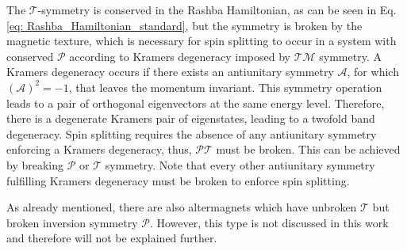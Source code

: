 The $\mathcal{T}$-symmetry is conserved in the Rashba Hamiltonian, as can be seen in Eq. \eqref{eq: Rashba_Hamiltonian_standard}, but the symmetry is broken by the magnetic texture, which is necessary for spin splitting to occur in a system with conserved $\mathcal{P}$ according to Kramers degeneracy imposed by $\mathcal{TM}$ symmetry.
A Kramers degeneracy occurs if there exists an antiunitary symmetry $\mathcal{A}$, for which $(\mathcal{A})^2=-1$, that leaves the momentum invariant. This symmetry operation leads to a pair of orthogonal eigenvectors at the same energy level. Therefore, there is a degenerate Kramers pair of eigenstates, leading to a twofold band degeneracy. 
Spin splitting requires the absence of any antiunitary symmetry enforcing a Kramers degeneracy, thus, $\mathcal{PT}$ must be broken. This can be achieved by breaking $\mathcal{P}$ or $\mathcal{T}$ symmetry. Note that every other antiunitary symmetry fulfilling Kramers degeneracy must be broken to enforce spin splitting.

As already mentioned, there are also altermagnets which have unbroken $\mathcal{T}$ but broken inversion symmetry $\mathcal{P}$. However, this type is not discussed in this work and therefore will not be explained further.\\

